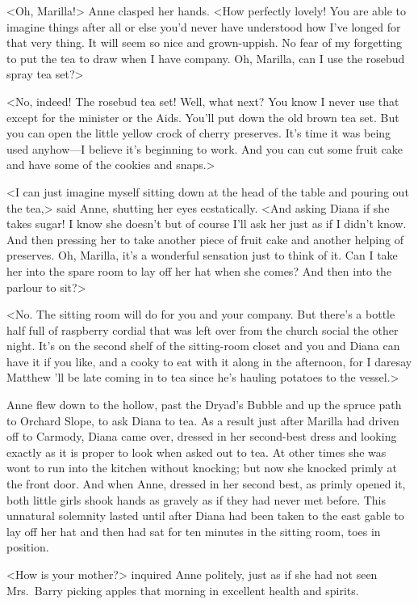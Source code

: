 <Oh, Marilla!> Anne clasped her hands. <How perfectly lovely! You are able to imagine things after all or else you'd never have understood how I've longed for that very thing. It will seem so nice and grown-uppish. No fear of my forgetting to put the tea to draw when I have company. Oh, Marilla, can I use the rosebud spray tea set?>

<No, indeed! The rosebud tea set! Well, what next? You know I never use that except for the minister or the Aids. You'll put down the old brown tea set. But you can open the little yellow crock of cherry preserves. It's time it was being used anyhow—I believe it's beginning to work. And you can cut some fruit cake and have some of the cookies and snaps.>

<I can just imagine myself sitting down at the head of the table and pouring out the tea,> said Anne, shutting her eyes ecstatically. <And asking Diana if she takes sugar! I know she doesn't but of course I'll ask her just as if I didn't know. And then pressing her to take another piece of fruit cake and another helping of preserves. Oh, Marilla, it's a wonderful sensation just to think of it. Can I take her into the spare room to lay off her hat when she comes? And then into the parlour to sit?>

<No. The sitting room will do for you and your company. But there's a bottle half full of raspberry cordial that was left over from the church social the other night. It's on the second shelf of the sitting-room closet and you and Diana can have it if you like, and a cooky to eat with it along in the afternoon, for I daresay Matthew 'll be late coming in to tea since he's hauling potatoes to the vessel.>

Anne flew down to the hollow, past the Dryad's Bubble and up the spruce path to Orchard Slope, to ask Diana to tea. As a result just after Marilla had driven off to Carmody, Diana came over, dressed in her second-best dress and looking exactly as it is proper to look when asked out to tea. At other times she was wont to run into the kitchen without knocking; but now she knocked primly at the front door. And when Anne, dressed in her second best, as primly opened it, both little girls shook hands as gravely as if they had never met before. This unnatural solemnity lasted until after Diana had been taken to the east gable to lay off her hat and then had sat for ten minutes in the sitting room, toes in position.

<How is your mother?> inquired Anne politely, just as if she had not seen Mrs.~Barry picking apples that morning in excellent health and spirits.


